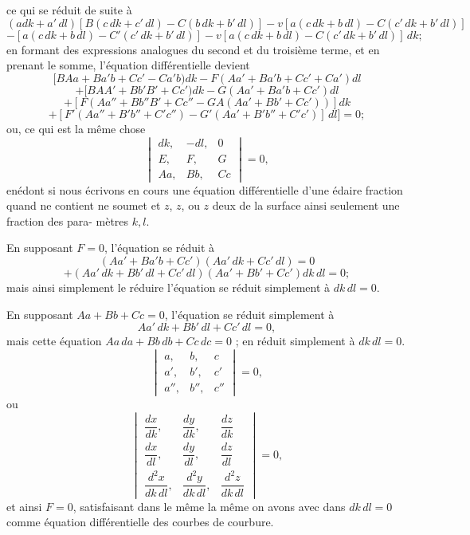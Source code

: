 \documentclass[11pt,a4paper]{book}
\begin{document}
\noindent
ce qui se r\'eduit de suite \`a
\[
(adk + a'\,dl)\!\left[B(c\,dk + c'\,dl) - C(b\,dk + b'\,dl)\right] - v\!\left[a(c\,dk + b\,dl) - C(c'\,dk + b'\,dl)\right]
\]
\[
- [a(c\,dk + b\,dl) - C'(c'\,dk + b'\,dl)] - v\!\left[a(c\,dk + b\,dl) - C(c'\,dk + b'\,dl)\right]\,dk;
\]
en formant des expressions analogues du second et du troisi\`eme terme, et en prenant
le somme, l'\'equation diff\'erentielle devient
\[
[BAa + Ba'b + Cc' - Ca'b)dk - F(Aa' + Ba'b + Cc' + Ca')dl
\]
\[
+ [BAA' + Bb'B' + Cc')dk - G(Aa' + Ba'b + Cc')dl
\]
\[
+ [F(Aa'' + Bb''B' + Cc'' - GA(Aa' + Bb' + Cc'))]dk
\]
\[
+ [F'(Aa'' + B'b'' + C'c'') - G'(Aa' + B'b'' + C'c')]\,dl] \!= 0;
\]
ou, ce qui est la m\^eme chose
\[
\begin{vmatrix}
dk, & -dl, & 0 \\
E, & F, & G \\
Aa, & Bb, & Cc
\end{vmatrix} = 0,
\]
en\'edont si nous \'ecrivons en cours une \'equation diff\'erentielle d'une \'edaire fraction quand
ne contient ne soumet et $z$, $z$, ou $z$ deux de la surface ainsi seulement une fraction des para-
m\`etres $k, l$.

En supposant $F = 0$, l'\'equation se r\'eduit \`a
\[
(Aa' + Ba'b + Cc')(Aa'\,dk + Cc'\,dl) = 0
\]
\[
+ (Aa'\,dk + Bb'\,dl + Cc'\,dl)(Aa' + Bb' + Cc')dk\,dl = 0;
\]
mais ainsi simplement le r\'eduire l'\'equation se r\'eduit simplement \`a $dk\,dl = 0$.

En supposant $Aa + Bb + Cc = 0$, l'\'equation se r\'eduit simplement \`a
\[
Aa'\,dk + Bb'\,dl + Cc'\,dl = 0,
\]
mais cette \'equation $Aa\,da + Bb\,db + Cc\,dc = 0$ ; en r\'eduit simplement \`a $dk\,dl = 0$.
\[
\begin{vmatrix}
a, & b, & c \\
a', & b', & c' \\
a'', & b'', & c''
\end{vmatrix} = 0,
\]
ou
\[
\begin{vmatrix}
\dfrac{dx}{dk}, & \dfrac{dy}{dk}, & \dfrac{dz}{dk} \\[6pt]
\dfrac{dx}{dl}, & \dfrac{dy}{dl}, & \dfrac{dz}{dl} \\[6pt]
\dfrac{d^2x}{dk\,dl}, & \dfrac{d^2y}{dk\,dl}, & \dfrac{d^2z}{dk\,dl}
\end{vmatrix} = 0,
\]
et ainsi $F = 0$, satisfaisant dans le m\^eme la m\^eme on avons avec dans $dk\,dl = 0$ comme
\'equation diff\'erentielle des courbes de courbure.

\clearpage
\clearpage
\end{document}
